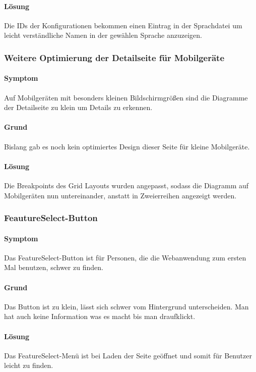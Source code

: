       \paragraph{Lösung}
      Die IDs der Konfigurationen bekommen einen Eintrag in der Sprachdatei um leicht verständliche
      Namen in der gewählen Sprache anzuzeigen.

    \subsubsection*{Weitere Optimierung der Detailseite für Mobilgeräte}
      \paragraph{Symptom}
        Auf Mobilgeräten mit besonders kleinen Bildschirmgrößen sind die Diagramme der Detailseite zu klein um Details zu erkennen.

      \paragraph{Grund}
      Bislang gab es noch kein optimiertes Design dieser Seite für kleine Mobilgeräte.

      \paragraph{Lösung}
      Die Breakpoints des Grid Layouts wurden angepasst, sodass die Diagramm auf Mobilgeräten nun untereinander, anstatt in Zweierreihen angezeigt werden.

    \subsubsection*{FeautureSelect-Button}
      \paragraph{Symptom}
      Das FeatureSelect-Button ist für Personen, die die Webanwendung zum ersten Mal benutzen, schwer zu finden.  

      \paragraph{Grund}
      Das Button ist zu klein, lässt sich schwer vom Hintergrund unterscheiden. Man hat auch keine Information was es macht bis man draufklickt.

      \paragraph{Lösung}
      Das FeatureSelect-Menü ist bei Laden der Seite geöffnet und somit für Benutzer leicht zu finden.

